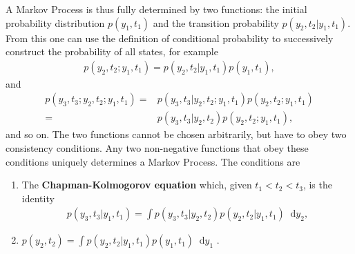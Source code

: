 \documentclass[twoside,english]{uiofysmaster}
\newcommand*\dif{\mathop{}\!\mathrm{d}}
\begin{document}
A Markov Process is thus fully determined by two functions:
the initial probability distribution $p (y_1, t_1)$ and 
the transition probability $p (y_2, t_2| y_1, t_1)$. 
From this one can use the definition of conditional probability to successively construct the probability of all states, for example
\begin{align}
	p (y_2, t_2; y_1, t_1) = p (y_2, t_2| y_1, t_1) p ( y_1, t_1),
\end{align}
and
\begin{align}
	p (y_3, t_3; y_2, t_2; y_1, t_1) =&  p (y_3, t_3 | y_2, t_2; y_1, t_1) p (y_2, t_2; y_1, t_1) \\
	=& p (y_3, t_3 | y_2, t_2) p (y_2, t_2; y_1, t_1),
\end{align}
and so on. The two functions cannot be chosen arbitrarily, but have to obey two consistency conditions. Any two non-negative functions that obey these conditions uniquely determines a Markov Process. The conditions are
\begin{mdframed}[hidealllines=true,backgroundcolor=blue!20]
\begin{enumerate}
	\item The \textbf{Chapman-Kolmogorov equation} which, given $t_1 < t_2 < t_3$, is the identity
\begin{align}
	p (y_3, t_3| y_1, t_1) = \int p (y_3, t_3|y_2, t_2) p (y_2, t_2 | y_1, t_1) \dif y_2 ,
\end{align}
	\item $p(y_2, t_2) = \int p (y_2, t_2| y_1, t_1) p (y_1, t_1) \dif y_1$ .
\end{enumerate}
\end{mdframed}
\end{document}
